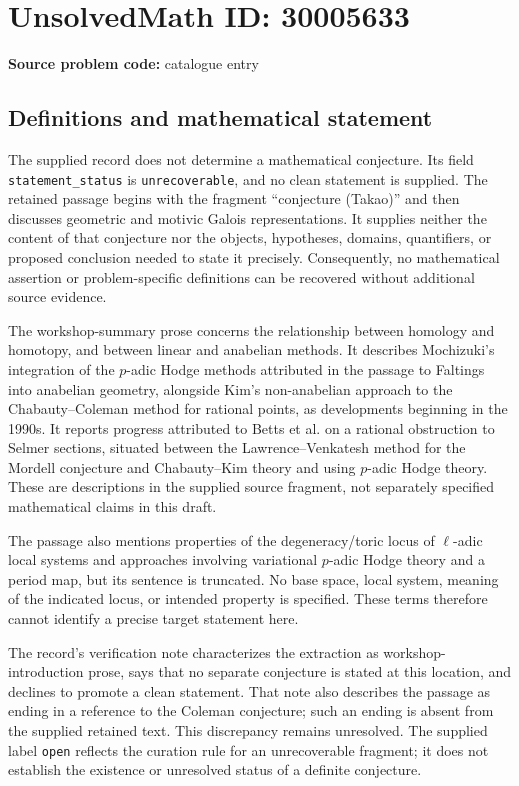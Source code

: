 \documentclass[11pt]{article}
\begin{document}
\section*{UnsolvedMath ID: 30005633}
\textbf{Source problem code:} catalogue entry
\subsection{Definitions and mathematical statement}
The supplied record does not determine a mathematical conjecture. Its field \texttt{statement\_status} is \texttt{unrecoverable}, and no clean statement is supplied. The retained passage begins with the fragment ``conjecture (Takao)'' and then discusses geometric and motivic Galois representations. It supplies neither the content of that conjecture nor the objects, hypotheses, domains, quantifiers, or proposed conclusion needed to state it precisely. Consequently, no mathematical assertion or problem-specific definitions can be recovered without additional source evidence.

The workshop-summary prose concerns the relationship between homology and homotopy, and between linear and anabelian methods. It describes Mochizuki's integration of the \(p\)-adic Hodge methods attributed in the passage to Faltings into anabelian geometry, alongside Kim's non-anabelian approach to the Chabauty--Coleman method for rational points, as developments beginning in the 1990s. It reports progress attributed to Betts et al. on a rational obstruction to Selmer sections, situated between the Lawrence--Venkatesh method for the Mordell conjecture and Chabauty--Kim theory and using \(p\)-adic Hodge theory. These are descriptions in the supplied source fragment, not separately specified mathematical claims in this draft.

The passage also mentions properties of the degeneracy/toric locus of \(\ell\)-adic local systems and approaches involving variational \(p\)-adic Hodge theory and a period map, but its sentence is truncated. No base space, local system, meaning of the indicated locus, or intended property is specified. These terms therefore cannot identify a precise target statement here.

The record's verification note characterizes the extraction as workshop-introduction prose, says that no separate conjecture is stated at this location, and declines to promote a clean statement. That note also describes the passage as ending in a reference to the Coleman conjecture; such an ending is absent from the supplied retained text. This discrepancy remains unresolved. The supplied label \texttt{open} reflects the curation rule for an unrecoverable fragment; it does not establish the existence or unresolved status of a definite conjecture.
\end{document}
